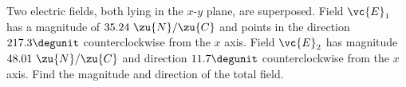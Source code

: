 Two electric fields, both lying in the $x$-$y$ plane, are superposed.
Field $\vc{E}_1$ has a magnitude of $35.24\ \zu{N}/\zu{C}$ and points
in the direction $217.3\degunit$ counterclockwise from the $x$ axis.
Field $\vc{E}_2$ has magnitude $48.01\ \zu{N}/\zu{C}$ and direction
$11.7\degunit$ counterclockwise from the $x$ axis.  Find the magnitude
and direction of the total field.\answercheck\hwendpart

